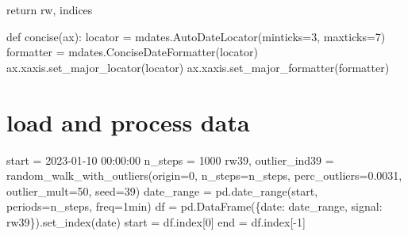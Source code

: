 \documentclass[
  letterpaper,
  DIV=11,
  numbers=noendperiod,
  oneside]{scrreprt}
\newenvironment{Shaded}{\begin{snugshade}}{\end{snugshade}}
\newcommand{\ControlFlowTok}[1]{\textcolor[rgb]{0.00,0.23,0.31}{#1}}
\newcommand{\DecValTok}[1]{\textcolor[rgb]{0.68,0.00,0.00}{#1}}
\newcommand{\FloatTok}[1]{\textcolor[rgb]{0.68,0.00,0.00}{#1}}
\newcommand{\KeywordTok}[1]{\textcolor[rgb]{0.00,0.23,0.31}{#1}}
\newcommand{\NormalTok}[1]{\textcolor[rgb]{0.00,0.23,0.31}{#1}}
\newcommand{\OperatorTok}[1]{\textcolor[rgb]{0.37,0.37,0.37}{#1}}
\newcommand{\StringTok}[1]{\textcolor[rgb]{0.13,0.47,0.30}{#1}}
\begin{document}
\begin{Shaded}
\begin{Highlighting}[]
    \ControlFlowTok{return}\NormalTok{ rw, indices}

\KeywordTok{def}\NormalTok{ concise(ax):}
\NormalTok{    locator }\OperatorTok{=}\NormalTok{ mdates.AutoDateLocator(minticks}\OperatorTok{=}\DecValTok{3}\NormalTok{, maxticks}\OperatorTok{=}\DecValTok{7}\NormalTok{)}
\NormalTok{    formatter }\OperatorTok{=}\NormalTok{ mdates.ConciseDateFormatter(locator)}
\NormalTok{    ax.xaxis.set\_major\_locator(locator)}
\NormalTok{    ax.xaxis.set\_major\_formatter(formatter)}
\end{Highlighting}
\end{Shaded}

\hypertarget{load-and-process-data}{%
\section{load and process data}\label{load-and-process-data}}

\begin{Shaded}
\begin{Highlighting}[]
\NormalTok{start }\OperatorTok{=} \StringTok{\textquotesingle{}2023{-}01{-}10 00:00:00\textquotesingle{}}
\NormalTok{n\_steps }\OperatorTok{=} \DecValTok{1000}
\NormalTok{rw39, outlier\_ind39 }\OperatorTok{=}\NormalTok{ random\_walk\_with\_outliers(origin}\OperatorTok{=}\DecValTok{0}\NormalTok{,}
\NormalTok{                                            n\_steps}\OperatorTok{=}\NormalTok{n\_steps,}
\NormalTok{                                            perc\_outliers}\OperatorTok{=}\FloatTok{0.0031}\NormalTok{,}
\NormalTok{                                            outlier\_mult}\OperatorTok{=}\DecValTok{50}\NormalTok{,}
\NormalTok{                                            seed}\OperatorTok{=}\DecValTok{39}\NormalTok{)}
\NormalTok{date\_range }\OperatorTok{=}\NormalTok{ pd.date\_range(start, periods}\OperatorTok{=}\NormalTok{n\_steps, freq}\OperatorTok{=}\StringTok{\textquotesingle{}1min\textquotesingle{}}\NormalTok{)}
\NormalTok{df }\OperatorTok{=}\NormalTok{ pd.DataFrame(\{}\StringTok{\textquotesingle{}date\textquotesingle{}}\NormalTok{: date\_range, }\StringTok{\textquotesingle{}signal\textquotesingle{}}\NormalTok{: rw39\}).set\_index(}\StringTok{\textquotesingle{}date\textquotesingle{}}\NormalTok{)}
\NormalTok{start }\OperatorTok{=}\NormalTok{ df.index[}\DecValTok{0}\NormalTok{]}
\NormalTok{end }\OperatorTok{=}\NormalTok{ df.index[}\OperatorTok{{-}}\DecValTok{1}\NormalTok{]}
\end{Highlighting}
\end{Shaded}
\end{document}
